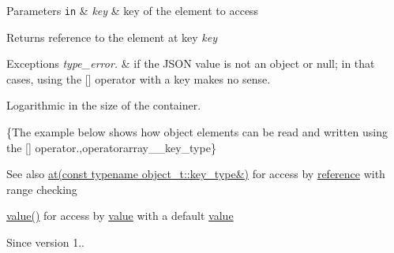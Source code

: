 \begin{DoxyParams}[1]{Parameters}
\mbox{\tt in}  & {\em key} & key of the element to access\\
\hline
\end{DoxyParams}
\begin{DoxyReturn}{Returns}
reference to the element at key {\itshape key} 
\end{DoxyReturn}

\begin{DoxyExceptions}{Exceptions}
{\em type\+\_\+error.} & if the J\+S\+ON value is not an object or null; in that cases, using the \mbox{[}\mbox{]} operator with a key makes no sense.\\
\hline
\end{DoxyExceptions}
Logarithmic in the size of the container.

\{The example below shows how object elements can be read and written using the {\ttfamily \mbox{[}\mbox{]}} operator.,operatorarray\+\_\+\+\_\+key\+\_\+type\}

\begin{DoxySeeAlso}{See also}
\hyperlink{classnlohmann_1_1basic__json_a239e942da82f2597d0cf5ec806f5bc0d}{at(const typename object\+\_\+t\+::key\+\_\+type\&)} for access by \hyperlink{classnlohmann_1_1basic__json_a220ae98554a76205fb7f8822d36b2d5a}{reference} with range checking 

\hyperlink{classnlohmann_1_1basic__json_ac9e014095170d72c4c57e3daf8efc059}{value()} for access by \hyperlink{classnlohmann_1_1basic__json_ac9e014095170d72c4c57e3daf8efc059}{value} with a default \hyperlink{classnlohmann_1_1basic__json_ac9e014095170d72c4c57e3daf8efc059}{value}
\end{DoxySeeAlso}
\begin{DoxySince}{Since}
version 1.. 
\end{DoxySince}
